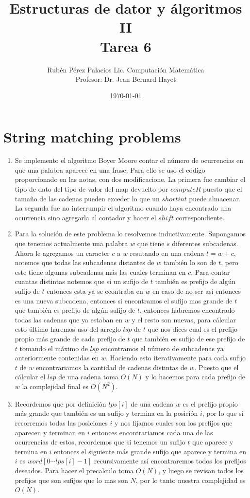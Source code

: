 \documentclass[letterpaper]{article}
\title{Estructuras de dator y álgoritmos II \\ Tarea 6}
\author{Rubén Pérez Palacios Lic. Computación Matemática\\Profesor: Dr. Jean-Bernard Hayet}
\date{\today}
\theoremstyle{definition}
\theoremstyle{lemathm}
\theoremstyle{lemathm}
\theoremstyle{lemathm}
\theoremstyle{lemademthm}
\newcommand{\1}{\mathbbm{1}}
\begin{document}
	\maketitle

	\section{String matching problems}
	
	\begin{enumerate}
		\item Se implemento el algoritmo Boyer Moore contar el número de ocurrencias en que una palabra aparece en una frase. Para ello se uso el código proporcionado en las notas, con dos modificacione. La primera fue cambiar el tipo de dato del tipo de valor del map devuelto por $computeR$ puesto que el tamaño de las cadenas pueden exceder lo que un $short int$ puede almacenar. La segunda fue no interrumpir el algoritmo cuando haya encontrado una ocurrencia sino agregarla al contador y hacer el $shift$ correspondiente.
		\item Para la solución de este problema lo resolvemos inductivamente. Supongamos que tenemos actualmente una palabra $w$ que tiene $s$ diferentes subcadenas. Ahora le agregamos un caracter $c$ a $w$ resutando en una cadena $t = w+c$, notemos que todas las subcadenas distantes de $w$ también lo son de $t$, pero este tiene algunas subcadenas más las cuales terminan en $c$. Para contar cuantas distintas notemos que si un sufijo de $t$ también es prefijo de algún sufijo de $t$ entonces esta ya se econtraba en $w$ en caso de no ser así entonces es una nueva subcadena, entonces si encontramos el sufijo mas grande de $t$ que también es prefijo de algún sufijo de $t$, entonces habremos encontrado todas las cadenas que ya estaban en $w$ y el resto son nuevas, para cálcular esto último haremos uso del arreglo $lsp$ de $t$ que nos dices cual es el prefijo propio más grande de cada prefijo de $t$ que también es sufijo de ese prefijo de $t$ tomando el máximo de $lsp$ encontramos el número de subcadenas ya anteriormente contenidas en $w$. Haciendo esto iterativamente para cada sufijo $t$ de $w$ encontrariamos la cantidad de cadenas distintas de $w$. Puesto que el cálcular el $lsp$ de una cadena toma $O(N)$ y lo hacemos para cada prefijo de $w$ la complejidad final es $O(N^2)$.
		\item Recordemos que por definición $lps[i]$ de una cadena $w$ es el prefijo propio más grande que también es un sufijo y termina en la posición $i$, por lo que si recorremos todas las posiciones $i$ y nos fijamos cuales son los prefijos que aparecen y terminan en $i$ entonces encontrariamos cada una de las ocurrencias de estos, recordemos que si tenemos un sufijo $t$ que aparece y termina en $i$ entonces el siguiente más grande sufijo que aparece y termina en $i$ es $word[0\cdots lps[i]-1]$ recursivamente así encontraremos todos los prefijos deseados. Para hacer el precalculo toma $O(N)$, y luego se revisan todos los prefijos que son sufijos que lo mas son $N$, por lo tanto nuestra complejidad es $O(N)$.
	\end{enumerate}
\end{document}
